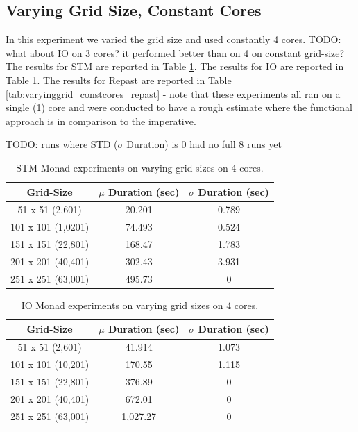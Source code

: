 \subsection{Varying Grid Size, Constant Cores}
In this experiment we varied the grid size and used constantly 4 cores. TODO: what about IO on 3 cores? it performed better than on 4 on constant grid-size? The results for STM are reported in Table \ref{tab:varyinggrid_constcores_stm}. The results for IO are reported in Table \ref{tab:varyinggrid_constcores_stm}. The results for Repast are reported in Table \ref{tab:varyinggrid_constcores_repast} - note that these experiments all ran on a single (1) core and were conducted to have a rough estimate where the functional approach is in comparison to the imperative. 

TODO: runs where STD ($\sigma$ Duration) is 0 had no full 8 runs yet

\begin{table}
	\centering
  	\begin{tabular}{ c || c | c }
        Grid-Size          & $\mu$ Duration (sec) & $\sigma$ Duration (sec) \\ \hline \hline 
   		51 x 51 (2,601)    & 20.201               & 0.789 \\ \hline
   		101 x 101 (1,0201) & 74.493               & 0.524 \\ \hline
   		151 x 151 (22,801) & 168.47               & 1.783 \\ \hline
   		201 x 201 (40,401) & 302.43               & 3.931 \\ \hline 
   		251 x 251 (63,001) & 495.73               & 0 \\ \hline
  	\end{tabular}

  	\caption{STM Monad experiments on varying grid sizes on 4 cores.}
	\label{tab:varyinggrid_constcores_stm}
\end{table}


\begin{table}
	\centering
  	\begin{tabular}{ c || c | c }
        Grid-Size          & $\mu$ Duration (sec) & $\sigma$ Duration (sec) \\ \hline \hline 
   		51 x 51 (2,601)    & 41.914 			 & 1.073 \\ \hline
   		101 x 101 (10,201) & 170.55 			 & 1.115 \\ \hline
   		151 x 151 (22,801) & 376.89 			 & 0 \\ \hline
   		201 x 201 (40,401) & 672.01 			 & 0 \\ \hline 
   		251 x 251 (63,001) & 1,027.27			 & 0 \\ \hline 
  	\end{tabular}
  	
  	\caption{IO Monad experiments on varying grid sizes on 4 cores.}
	\label{tab:varyinggrid_constcores4_IO}
\end{table}

